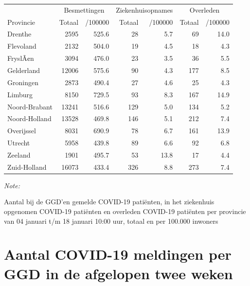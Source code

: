 \documentclass[
  english,
  man,floatsintext]{apa6}
\begin{document}
\begin{table}[H]
\centering
\begin{threeparttable}
\begin{tabular}{lrrrrrr}
\toprule
\multicolumn{1}{c}{ } & \multicolumn{2}{c}{Besmettingen} & \multicolumn{2}{c}{Ziekenhuisopnames} & \multicolumn{2}{c}{Overleden} \\
\cmidrule(l{3pt}r{3pt}){2-3} \cmidrule(l{3pt}r{3pt}){4-5} \cmidrule(l{3pt}r{3pt}){6-7}
Provincie & Totaal & /100000 & Totaal & /100000 & Totaal & /100000\\
\midrule
Drenthe & 2595 & 525.6 & 28 & 5.7 & 69 & 14.0\\
Flevoland & 2132 & 504.0 & 19 & 4.5 & 18 & 4.3\\
FryslÃ¢n & 3094 & 476.0 & 23 & 3.5 & 36 & 5.5\\
Gelderland & 12006 & 575.6 & 90 & 4.3 & 177 & 8.5\\
Groningen & 2873 & 490.4 & 27 & 4.6 & 25 & 4.3\\
Limburg & 8150 & 729.5 & 93 & 8.3 & 167 & 14.9\\
Noord-Brabant & 13241 & 516.6 & 129 & 5.0 & 134 & 5.2\\
Noord-Holland & 13528 & 469.8 & 146 & 5.1 & 212 & 7.4\\
Overijssel & 8031 & 690.9 & 78 & 6.7 & 161 & 13.9\\
Utrecht & 5958 & 439.8 & 89 & 6.6 & 92 & 6.8\\
Zeeland & 1901 & 495.7 & 53 & 13.8 & 17 & 4.4\\
Zuid-Holland & 16073 & 433.4 & 326 & 8.8 & 273 & 7.4\\
\bottomrule
\end{tabular}
\begin{tablenotes}
\item \textit{Note: } 
\item Aantal bij de GGD’en gemelde COVID-19 patiënten, in het ziekenhuis opgenomen COVID-19 patiënten en overleden COVID-19 patiënten per provincie van 04 januari t/m 18 januari 10:00 uur, totaal en per 100.000 inwoners
\end{tablenotes}
\end{threeparttable}
\end{table}

\newpage

\hypertarget{aantal-covid-19-meldingen-per-ggd-in-de-afgelopen-twee-weken}{%
\section{Aantal COVID-19 meldingen per GGD in de afgelopen twee weken}\label{aantal-covid-19-meldingen-per-ggd-in-de-afgelopen-twee-weken}}
\end{document}
